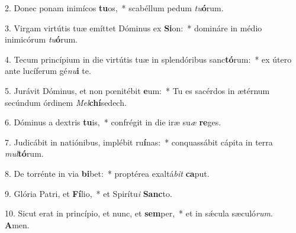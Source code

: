 2. Donec ponam inimícos \textbf{tu}os,~*  scabéllum pedum \textit{tu}\textbf{ó}rum.\

3. Virgam virtútis tuæ emíttet Dóminus ex \textbf{Si}on:~*  domináre in médio inimicórum \textit{tu}\textbf{ó}rum.\

4. Tecum princípium in die virtútis tuæ in splendóribus sanc\textbf{tó}rum:~*  ex útero ante lucíferum gé\textit{nu}\textbf{i} te.\

5. Jurávit Dóminus, et non pœnitébit \textbf{e}um:~*  Tu es sacérdos in ætérnum secúndum órdinem \textit{Mel}\textbf{chí}sedech.\

6. Dóminus a dextris \textbf{tu}is,~*  confrégit in die iræ su\textit{æ} \textbf{re}ges.\

7. Judicábit in natiónibus, implébit ru\textbf{í}nas:~*  conquassábit cápita in terra \textit{mul}\textbf{tó}rum.\

8. De torrénte in via \textbf{bi}bet:~*  proptérea exaltá\textit{bit} \textbf{ca}put.\

9. Glória Patri, et \textbf{Fí}lio,~*  et Spirítu\textit{i} \textbf{Sanc}to.\

10. Sicut erat in princípio, et nunc, et \textbf{sem}per,~*  et in sǽcula sæculó\textit{rum}. \textbf{A}men.\

